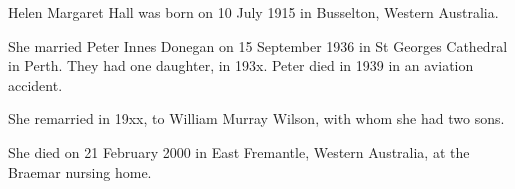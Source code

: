 
Helen Margaret Hall was born on 10 July 1915 in Busselton, Western Australia.\cite{HMHbirth}

She married Peter Innes Donegan on 15 September 1936 in St Georges Cathedral in Perth.
They had one daughter, in 193x.
Peter died in 1939 in an aviation accident.

She remarried in 19xx, to William Murray Wilson, with whom she had two sons.

She died on 21 February 2000 in East Fremantle, Western Australia, at the Braemar nursing home.
